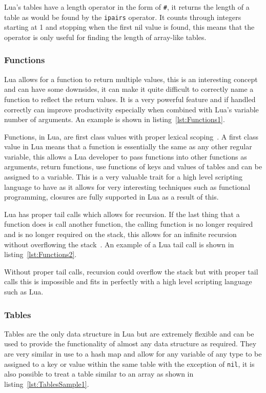 \documentclass[11pt,a4paper,titlepage]{article}
\begin{document}
			Lua's tables have a length operator in the form of \texttt{\#}, it returns the length of a table as would be found by the \texttt{ipairs} operator. It counts through integers starting at 1 and stopping when the first nil value is found, this means that the operator is only useful for finding the length of array-like tables.

		\subsubsection{Functions}
			Lua allows for a function to return multiple values, this is an interesting concept and can have some downsides, it can make it quite difficult to correctly name a function to reflect the return values. It is a very powerful feature and if handled correctly can improve productivity especially when combined with Lua's variable number of arguments. An example is shown in listing~\ref{lst:Functions1}.
			

			Functions, in Lua, are first class values with proper lexical scoping~\cite{Ierusalimschy:2013:PLT:2502646}. A first class value in Lua means that a function is essentially the same as any other regular variable, this allows a Lua developer to pass functions into other functions as arguments, return functions, use functions of keys and values of tables and can be assigned to a variable. This is a very valuable trait for a high level scripting language to have as it allows for very interesting techniques such as functional programming, closures are fully supported in Lua as a result of this.

			Lua has proper tail calls which allows for recursion. If the last thing that a function does is call another function, the calling function is no longer required and is no longer required on the stack, this allows for an infinite recursion without overflowing the stack~\cite{Ierusalimschy:2013:PLT:2502646}. An example of a Lua tail call is shown in listing~\ref{lst:Functions2}.
			

			Without proper tail calls, recursion could overflow the stack but with proper tail calls this is impossible and fits in perfectly with a high level scripting language such as Lua.

		\subsubsection{Tables}
			Tables are the only data structure in Lua but are extremely flexible and can be used to provide the functionality of almost any data structure as required. They are very similar in use to a hash map and allow for any variable of any type to be assigned to a key or value within the same table with the exception of \texttt{nil}, it is also possible to treat a table similar to an array as shown in listing~\ref{lst:TablesSample1}.
			
\end{document}
